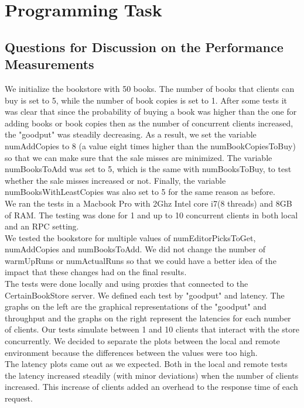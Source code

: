 \documentclass{article}      %
\begin{document}
\section*{Programming Task}

\subsection*{Questions for Discussion on the Performance Measurements}

We initialize the bookstore with 50 books. The number of books that clients can buy is set to 5, while the number of book copies is set to 1. After some tests it was clear that since the probability of buying a book was higher than the one for adding books or book copies then as the number of concurrent clients increased, the "goodput" was steadily decreasing. As a result, we set the variable numAddCopies to 8 (a value eight times higher than the numBookCopiesToBuy) so that we can make sure that the sale misses are minimized.  The variable numBooksToAdd was set to 5, which is the same with numBooksToBuy, to test whether the sale misses increased or not. Finally, the variable numBooksWithLeastCopies was also set to 5 for the same reason as before.\\

We ran the tests in a Macbook Pro with 2Ghz Intel core i7(8 threads) and 8GB of RAM. The testing was done for 1 and up to 10 concurrent clients in both local and an RPC setting. \\

We tested the bookstore for multiple values of numEditorPicksToGet, numAddCopies and numBooksToAdd. We did not change the number of warmUpRuns or numActualRuns so that we could have a better idea of the impact that these changes had on the final results.\\

The tests were done locally and using proxies that connected to the CertainBookStore server. We defined each test by "goodput" and latency. The graphs on the left are the graphical representations of the "goodput" and throughput and the graphs on the right represent the latencies for each number of clients. Our tests simulate between 1 and 10 clients that interact with the store concurrently. We decided to separate the plots between the local and remote environment because the differences between the values were too high.\\

The latency plots came out as we expected. Both in the local and remote tests the latency increased steadily (with minor deviations) when the number of clients increased. This increase of clients added an overhead to the response time of each request.\\
\end{document}
